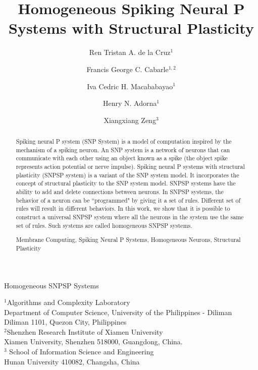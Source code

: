 \documentclass[runningheads,a4paper]{llncs}
\newcommand{\keywords}[1]{\par\addvspace\baselineskip
\noindent\keywordname\enspace\ignorespaces#1}
\begin{document}
\mainmatter


\title
{
Homogeneous Spiking Neural P Systems with Structural Plasticity
}

\titlerunning
{
Homogeneous SNPSP Systems
}


\author
{
Ren Tristan A. de la Cruz$^1$
\and
Francis George C. Cabarle$^{1,2}$
\and
Iva Cedric H. Macababayao$^{1}$
\and
Henry N. Adorna$^1$ 
\and
Xiangxiang Zeng$^3$
}



\institute
{
$^1$Algorithms and Complexity Laboratory \\
Department of Computer Science, University of the Philippines - Diliman\\
Diliman 1101, Quezon City, Philippines    \\
$^2$Shenzhen Research Institute of Xiamen University \\
Xiamen University, Shenzhen 518000, Guangdong, China.\\
$^3$ School of Information Science and Engineering\\
Hunan University 410082, Changsha, China \\
}




\maketitle





\begin{abstract}

Spiking neural P system (SNP System) is a model of computation inspired by the mechanism of a spiking neuron. An SNP system is a network of neurons
that can communicate with each other using an object known as a spike (the object spike represents action potential or nerve impulse).  Spiking neural 
P systems with structural plasticity (SNPSP system) is a variant of the SNP system model. It incorporates the concept of structural plasticity to the
SNP system model. SNPSP systems have the ability to add and delete connections between neurons. In SNPSP systems, the behavior of a neuron can be
``programmed" by giving it a set of rules. Different set of rules will result in different behaviors. In this work, we show that it is possible to
construct a universal SNPSP system where all the neurons in the system use the same set of rules. Such systems are called homogeneous SNPSP systems.

\keywords{Membrane Computing, 
          Spiking Neural P Systems, 
          Homogeneous Neurons,
          Structural Plasticity}
\end{abstract}
\end{document}
